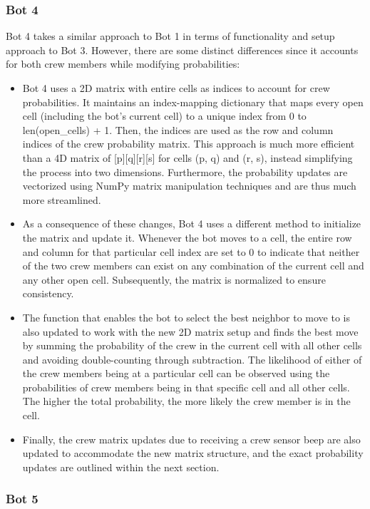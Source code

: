 \documentclass[11pt]{article}
\begin{document}
\subsubsection{Bot 4}

Bot 4 takes a similar approach to Bot 1 in terms of functionality and setup approach to Bot 3. However, there are some distinct differences since it accounts for both crew members while modifying probabilities:

\begin{itemize}
    \item Bot 4 uses a 2D matrix with entire cells as indices to account for crew probabilities. It maintains an index-mapping dictionary that maps every open cell (including the bot's current cell) to a unique index from 0 to len(open\_cells) + 1. Then, the indices are used as the row and column indices of the crew probability matrix. This approach is much more efficient than a 4D matrix of [p][q][r][s] for cells (p, q) and (r, s), instead simplifying the process into two dimensions. Furthermore, the probability updates are vectorized using NumPy matrix manipulation techniques and are thus much more streamlined.
    \item As a consequence of these changes, Bot 4 uses a different method to initialize the matrix and update it. Whenever the bot moves to a cell, the entire row and column for that particular cell index are set to 0 to indicate that neither of the two crew members can exist on any combination of the current cell and any other open cell. Subsequently, the matrix is normalized to ensure consistency.
    \item The function that enables the bot to select the best neighbor to move to is also updated to work with the new 2D matrix setup and finds the best move by summing the probability of the crew in the current cell with all other cells and avoiding double-counting through subtraction. The likelihood of either of the crew members being at a particular cell can be observed using the probabilities of crew members being in that specific cell and all other cells. The higher the total probability, the more likely the crew member is in the cell.
    \item Finally, the crew matrix updates due to receiving a crew sensor beep are also updated to accommodate the new matrix structure, and the exact probability updates are outlined within the next section.
\end{itemize}

\subsubsection{Bot 5}
\end{document}
